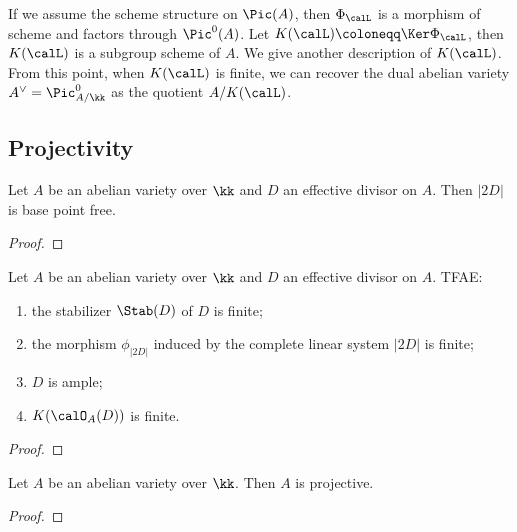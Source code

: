     If we assume the scheme structure on \(\Pic(A)\), then \(\Phi_\calL\) is a morphism of scheme and factors through \(\Pic^0(A)\).
    Let \(K(\calL) \coloneqq \Ker \Phi_\calL\), then \(K(\calL)\) is a subgroup scheme of \(A\).
    We give another description of \(K(\calL)\).
    From this point, when \(K(\calL)\) is finite, we can recover the dual abelian variety \(A^\vee = \Pic^0_{A/\kk}\) as the quotient \(A/K(\calL)\).



\subsection{Projectivity}

    \begin{proposition}\label{prop:2D_is_base_point_free}
        Let \(A\) be an abelian variety over \(\kk\) and \(D\) an effective divisor on \(A\).
        Then \(|2D|\) is base point free.
    \end{proposition}
    \begin{proof}
    \end{proof}

    \begin{theorem}\label{thm:ample_criteria_for_abelian_varieties}
        Let \(A\) be an abelian variety over \(\kk\) and \(D\) an effective divisor on \(A\).
        TFAE:
        \begin{enumerate}
            \item the stabilizer \(\Stab(D)\) of \(D\) is finite;
            \item the morphism \(\phi_{|2D|}\) induced by the complete linear system \(|2D|\) is finite;
            \item \(D\) is ample;
            \item \(K(\calO_A(D))\) is finite.
        \end{enumerate}
    \end{theorem}
    \begin{proof}
    \end{proof}

    \begin{theorem}\label{thm: abelian varieties are projective}
        Let $A$ be an abelian variety over $\kk$. 
        Then $A$ is projective.
    \end{theorem}
    \begin{proof}
    \end{proof}

